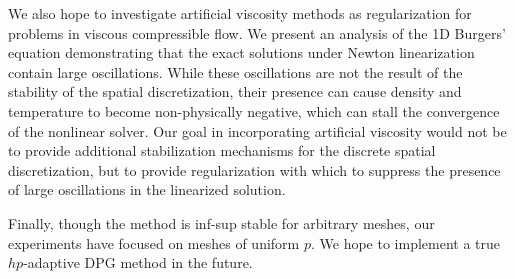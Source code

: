We also hope to investigate artificial viscosity methods as regularization for problems in viscous compressible flow.  We present an analysis of the 1D Burgers' equation demonstrating that the exact solutions under Newton linearization contain large oscillations.  While these oscillations are not the result of the stability of the spatial discretization, their presence can cause density and temperature to become non-physically negative, which can stall the convergence of the nonlinear solver.  Our goal in incorporating artificial viscosity would not be to provide additional stabilization mechanisms for the discrete spatial discretization, but to provide regularization with which to suppress the presence of large oscillations in the linearized solution.  

Finally, though the method is inf-sup stable for arbitrary meshes, our experiments have focused on meshes of uniform $p$.  We hope to implement a true $hp$-adaptive DPG method in the future.  